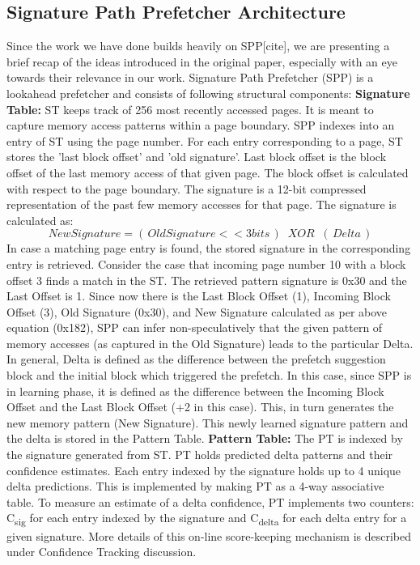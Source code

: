 \documentclass{sig-alternate}
\begin{document}
\subsection{Signature Path Prefetcher Architecture}
Since the work we have done builds heavily on SPP[cite], we are presenting a brief recap of the ideas introduced in the original paper, especially with an eye towards their relevance in our work. 
Signature Path Prefetcher (SPP) is a lookahead prefetcher and consists of following structural components:
\newline
\newline
\textbf{Signature Table:} ST keeps track of 256 most recently accessed pages. 
It is meant to capture memory access patterns within a page boundary. 
SPP indexes into an entry of ST using the page number. 
For each entry corresponding to a page, ST stores the 'last block offset' and 'old signature'. 
Last block offset is the block offset of the last memory access of that given page. 
The block offset is calculated with respect to the page boundary. 
The signature is a 12-bit compressed representation of the past few memory accesses for that page. 
The signature is calculated as:
$$New Signature = (\,Old Signature << 3 bits\,) \;\;XOR\;\; (\,Delta\,)$$ 
In case a matching page entry is found, the stored signature in the corresponding entry is retrieved.
\newline
\newline
Consider the case that incoming page number 10 with a block offset 3 finds a match in the ST. 
The retrieved pattern signature is 0x30 and the Last Offset is 1. 
Since now there is the Last Block Offset (1), Incoming Block Offset (3), Old Signature (0x30), and New Signature calculated as per above equation (0x182), SPP can infer non-speculatively that the given pattern of memory accesses (as captured in the Old Signature) leads to the particular Delta. 
In general, Delta is defined as the difference between the prefetch suggestion block and the initial block which triggered the prefetch. 
In this case, since SPP is in learning phase, it is defined as the difference between the Incoming Block Offset and the Last Block Offset (+2 in this case). 
This, in turn generates the new memory pattern (New Signature). 
This newly learned signature pattern and the delta is stored in the Pattern Table.
\newline
\newline
\textbf{Pattern Table:} The PT is indexed by the signature generated from ST. 
PT holds predicted delta patterns and their confidence estimates. 
Each entry indexed by the signature holds up to 4 unique delta predictions. 
This is implemented by making PT as a 4-way associative table. 
To measure an estimate of a delta confidence, PT implements two counters: C\textsubscript{sig} for each entry indexed by the signature and C\textsubscript{delta} for each delta entry for a given signature. 
More details of this on-line score-keeping mechanism is described under Confidence Tracking discussion.
\end{document}
